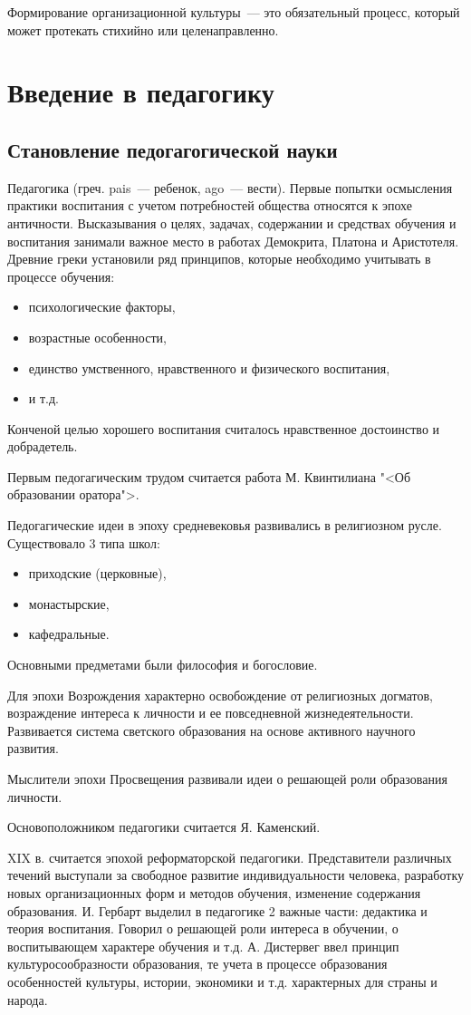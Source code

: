 Формирование организационной культуры~--- это обязательный процесс, который может протекать стихийно или целенаправленно.

\section{Введение в педагогику}
\subsection{Становление педогагогической науки}
Педагогика (греч. pais~--- ребенок, ago~--- вести). Первые попытки осмысления практики воспитания с учетом потребностей общества относятся к эпохе античности. Высказывания о целях, задачах, содержании и средствах обучения и воспитания занимали важное место в работах Демокрита, Платона и Аристотеля. Древние греки установили ряд принципов, которые необходимо учитывать в процессе обучения:
\begin{itemize}
	\item психологические факторы,
	\item возрастные особенности,
	\item единство умственного, нравственного и физического воспитания,
	\item и т.д.
\end{itemize}
Конченой целью хорошего воспитания считалось нравственное достоинство и добрадетель.

Первым педогагическим трудом считается работа М. Квинтилиана "<Об образовании оратора">.

Педогагические идеи в эпоху средневековья развивались в религиозном русле. Существовало 3 типа школ:
\begin{itemize}
	\item приходские (церковные),
	\item монастырские,
	\item кафедральные.
\end{itemize}
Основными предметами были философия и богословие.

Для эпохи Возрождения характерно освобождение от религиозных догматов, возраждение интереса к личности и ее повседневной жизнедеятельности. Развивается система светского образования на основе активного научного развития.

Мыслители эпохи Просвещения развивали идеи о решающей роли образования личности.

Основоположником педагогики считается Я. Каменский. 

XIX в. считается эпохой реформаторской педагогики. Представители различных течений выступали за свободное развитие индивидуальности человека, разработку новых организационных форм и методов обучения, изменение содержания образования. И. Гербарт выделил в педагогике 2 важные части: дедактика и теория воспитания. Говорил о решающей роли интереса в обучении, о воспитывающем характере обучения и т.д. А. Дистервег ввел принцип культуросообразности образования, те учета в процессе образования особенностей культуры, истории, экономики и т.д. характерных для страны и народа.


